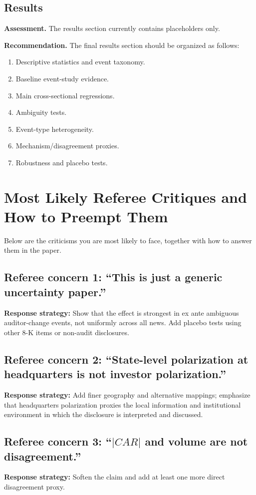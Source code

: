 \documentclass[12pt]{article}
\begin{document}
\subsection{Results}
\textbf{Assessment.} The results section currently contains placeholders only.

\textbf{Recommendation.} The final results section should be organized as follows:
\begin{enumerate}[leftmargin=2em]
    \item Descriptive statistics and event taxonomy.
    \item Baseline event-study evidence.
    \item Main cross-sectional regressions.
    \item Ambiguity tests.
    \item Event-type heterogeneity.
    \item Mechanism/disagreement proxies.
    \item Robustness and placebo tests.
\end{enumerate}

\section{Most Likely Referee Critiques and How to Preempt Them}
Below are the criticisms you are most likely to face, together with how to answer them in the paper.

\subsection*{Referee concern 1: ``This is just a generic uncertainty paper.''}
\textbf{Response strategy:} Show that the effect is strongest in ex ante ambiguous auditor-change events, not uniformly across all news. Add placebo tests using other 8-K items or non-audit disclosures.

\subsection*{Referee concern 2: ``State-level polarization at headquarters is not investor polarization.''}
\textbf{Response strategy:} Add finer geography and alternative mappings; emphasize that headquarters polarization proxies the local information and institutional environment in which the disclosure is interpreted and discussed.

\subsection*{Referee concern 3: ``$|CAR|$ and volume are not disagreement.''}
\textbf{Response strategy:} Soften the claim and add at least one more direct disagreement proxy.
\end{document}
